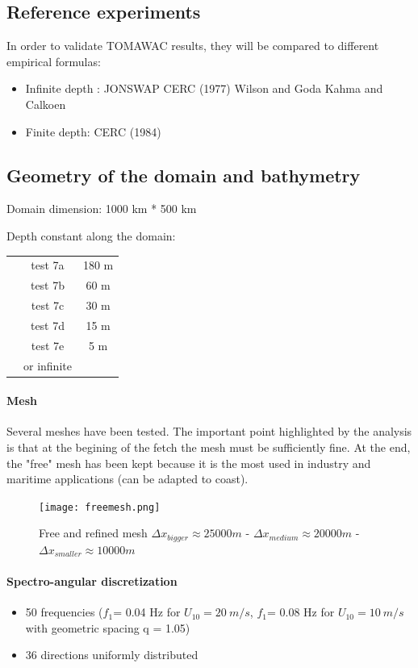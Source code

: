 \subsection{Reference experiments}
In order to validate TOMAWAC results, they will be compared to different empirical formulas:
\begin{itemize}
\item Infinite depth :
\subitem JONSWAP \cite{Hasselmann1973}
\subitem CERC (1977) \cite{CERC77}
\subitem Wilson and Goda \cite{Wilson1965}
\subitem Kahma and Calkoen \cite{Kahma1992}
\item Finite depth:
\subitem CERC (1984)\cite{CERC84}
\end{itemize}
\subsection{Geometry of the domain and bathymetry}
Domain  dimension: 1000 km * 500 km

Depth constant along the domain:
\begin{tabular}{ccc}
 & test 7a & 180 m\\
 & test 7b & 60 m\\
& test 7c & 30 m\\
& test 7d & 15 m\\
& test 7e & 5 m\\
 & or infinite\\
\end{tabular}
\paragraph{Mesh}
Several meshes have been tested. The important point highlighted by the analysis is that at the begining of the fetch the mesh must be sufficiently fine. At the end, the "free" mesh has been kept because it is the most used in industry and maritime applications (can be adapted to coast).
\begin{figure}[H]
\centering
\texttt{[image: freemesh.png]}
\caption{Free and refined mesh $\Delta x_{bigger} \approx 25 000 m$ - $\Delta x_{medium} \approx 20 000 m$ - $\Delta x_{smaller} \approx 10 000 m$}
\label{meshfet}
\end{figure}

\paragraph{Spectro-angular discretization}
\begin{itemize}
\item 50 frequencies ($f_1 $= 0.04 Hz for $U_{10} = 20~m/s$, $f_1 $= 0.08 Hz for $U_{10} = 10~m/s$ with geometric spacing q = 1.05)
\item 36 directions uniformly distributed
\end{itemize}

